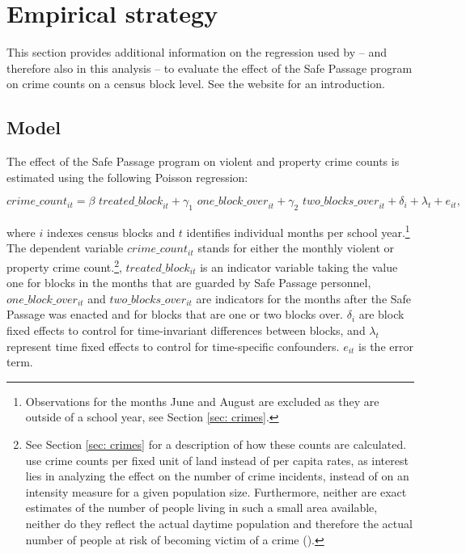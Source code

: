 \documentclass[]{article}
\begin{document}
\section{Empirical strategy}
\label{sec: empstrategy}
This section provides additional information on the regression used by \cite{mcmillen2017} -- and therefore also in this analysis -- to evaluate the effect of the Safe Passage program on crime counts on a census block level. See the website for an introduction.

\subsection{Model}
The effect of the Safe Passage program on violent and property crime counts is estimated using the following Poisson regression:

\begin{equation}
crime\_count_{it} = \beta \textit{ treated\_block}_{it} + \gamma_1 \textit{ one\_block\_over}_{it} + \gamma_2 \textit{ two\_blocks\_over}_{it} + \delta_i + \lambda_t + e_{it} \label{eq: poisson},
\end{equation}

where $i$ indexes census blocks and $t$ identifies individual months per school year.\footnote{Observations for the months June and August are excluded as they are outside of a school year, see Section \ref{sec: crimes}.} The dependent variable $crime\_count_{it}$ stands for either the monthly violent or  property crime count.\footnote{See Section \ref{sec: crimes} for a description of how these counts are calculated. \cite{mcmillen2017} use crime counts per fixed unit of land instead of per capita rates, as interest lies in analyzing the effect on the number of crime incidents, instead of on an intensity measure for a given population size. Furthermore,  neither are exact estimates of the number of people living in such a small area available, neither do they reflect the actual daytime population and therefore the actual number of people at risk of becoming victim of a crime (\citealt{grogger2002effects}).}, $treated\_block_{it}$ is an indicator variable taking the value one for blocks in the months that are guarded by Safe Passage personnel, $one\_block\_over_{it}$ and $two\_blocks\_over_{it}$ are indicators for the months after the Safe Passage was enacted and for blocks that are one or two blocks over. $\delta_i$ are block fixed effects to control for time-invariant differences between blocks, and $\lambda_t$  represent time fixed effects to control for time-specific confounders. $e_{it}$ is the error term.\\
\end{document}
